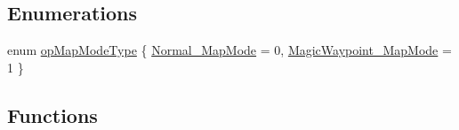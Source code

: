 \subsection*{\-Enumerations}
\begin{DoxyCompactItemize}
\item 
enum \hyperlink{group___o_p_map_plugin_ga10cb3e7dfbac87e40e00c1a8c76c16e5}{op\-Map\-Mode\-Type} \{ \hyperlink{group___o_p_map_plugin_gga10cb3e7dfbac87e40e00c1a8c76c16e5afdcda6e378c8e0a54e928947a5fdede8}{\-Normal\-\_\-\-Map\-Mode} =  0, 
\hyperlink{group___o_p_map_plugin_gga10cb3e7dfbac87e40e00c1a8c76c16e5abdc1c0b7296fb52149bbda0739034825}{\-Magic\-Waypoint\-\_\-\-Map\-Mode} =  1
 \}
\end{DoxyCompactItemize}
\subsection*{\-Functions}

